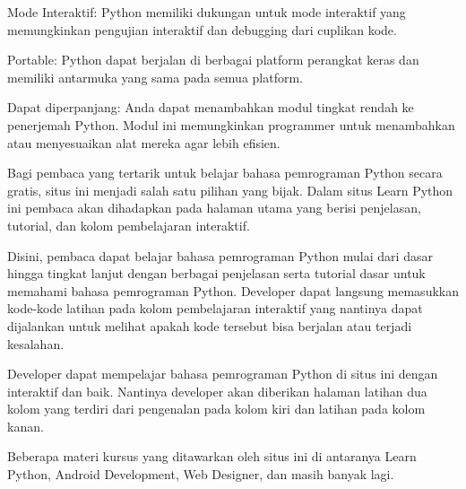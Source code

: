 \noindent 
{\fontsize{14pt}{14pt}\selectfont Mode Interaktif: Python memiliki dukungan untuk mode interaktif yang memungkinkan pengujian interaktif dan debugging dari cuplikan kode. \\} \par
\vspace{14pt}
\noindent 
{\fontsize{14pt}{14pt}\selectfont Portable: Python dapat berjalan di berbagai platform perangkat keras dan memiliki antarmuka yang sama pada semua platform. \\} \par
\vspace{14pt}
\noindent 
{\fontsize{14pt}{14pt}\selectfont Dapat diperpanjang: Anda dapat menambahkan modul tingkat rendah ke penerjemah Python. Modul ini memungkinkan programmer untuk menambahkan atau menyesuaikan alat mereka agar lebih efisien. \\} \par
\vspace{14pt}
\noindent 
{\fontsize{14pt}{14pt}\selectfont Bagi pembaca yang tertarik untuk belajar bahasa pemrograman Python secara gratis, situs ini menjadi salah satu pilihan yang bijak. Dalam situs Learn Python ini pembaca akan dihadapkan pada halaman utama yang berisi penjelasan, tutorial, dan kolom pembelajaran interaktif. \\} \par
\noindent 
{\fontsize{14pt}{14pt}\selectfont Disini, pembaca dapat belajar bahasa pemrograman Python mulai dari dasar hingga tingkat lanjut dengan berbagai penjelasan serta tutorial dasar untuk memahami bahasa pemrograman Python. Developer dapat langsung memasukkan kode-kode latihan pada kolom pembelajaran interaktif yang nantinya dapat dijalankan untuk melihat apakah kode tersebut bisa berjalan atau terjadi kesalahan. \\} \par
\vspace{14pt}
\noindent 
{\fontsize{14pt}{14pt}\selectfont Developer dapat mempelajar bahasa pemrograman Python di situs ini dengan interaktif dan baik. Nantinya developer akan diberikan halaman latihan dua kolom yang terdiri dari pengenalan pada kolom kiri dan latihan pada kolom kanan. \\} \par
\noindent 
{\fontsize{14pt}{14pt}\selectfont Beberapa materi kursus yang ditawarkan oleh situs ini di antaranya Learn Python, Android Development, Web Designer, dan masih banyak lagi. \\} \par
